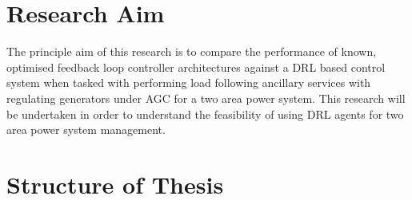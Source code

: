 \section{Research Aim}
The principle aim of this research is to compare the performance of known, optimised feedback loop controller architectures against a DRL based control system when tasked with performing load following ancillary services with regulating generators under AGC for a two area power system. This research will be undertaken in order to understand the feasibility of using DRL agents for two area power system management.

\section{Structure of Thesis}

